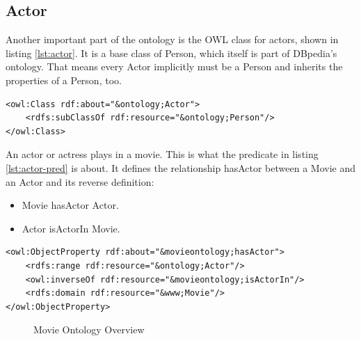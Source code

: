 \subsection{Actor}
Another important part of the ontology is the OWL class for actors, shown in listing \ref{lst:actor}. It is a base class of Person, which itself is part of DBpedia's ontology. That means every Actor implicitly must be a Person and inherits the properties of a Person, too.

\begin{lstlisting}[caption={OWL Actor Class in RDF/XML notation},label={lst:actor}]
<owl:Class rdf:about="&ontology;Actor">
	<rdfs:subClassOf rdf:resource="&ontology;Person"/>
</owl:Class>
\end{lstlisting}

An actor or actress plays in a movie. This is what the predicate in listing \ref{lst:actor-pred} is about. It defines the relationship hasActor between a Movie and an Actor and its reverse definition:
\begin{itemize}
	\item Movie hasActor Actor.
	\item Actor isActorIn Movie.
\end{itemize}

\begin{lstlisting}[caption={Exemplary Actor predicate in RDF/XML notation},label={lst:actor-pred}]
<owl:ObjectProperty rdf:about="&movieontology;hasActor">
	<rdfs:range rdf:resource="&ontology;Actor"/>
	<owl:inverseOf rdf:resource="&movieontology;isActorIn"/>
	<rdfs:domain rdf:resource="&www;Movie"/>
</owl:ObjectProperty>
\end{lstlisting}

\begin{figure}[h]
	\centering
	\caption{Movie Ontology Overview}
	\label{fig:movie-ont}
\end{figure}

